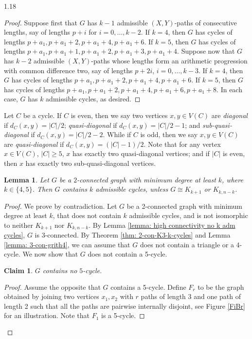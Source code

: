 \documentclass[10pt]{article}
\newtheorem{lemma}[theorem]{Lemma}
\newtheorem{claim}{Claim}
\begin{document}
\begin{spacing}{1.18}
\begin{proof}
    Suppose first that $G$ has $k-1$ admissible $(X,Y)$-paths of consecutive lengths, say of lengths $p+i$ for $i=0,\ldots,k-2$. If $k=4$, then $G$ has cycles of lengths $p+a_1, p+a_1+2, p+a_1+4, p+a_1+6$. If $k=5$, then $G$ has cycles of lengths $p+a_1, p+a_1+1, p+a_1+2, p+a_1+3, p+a_1+4$. Suppose now that $G$ has $k-2$ admissible $(X,Y)$-paths whose lengths form an arithmetic progression with common difference two, say of lengths $p+2i$, $i=0,\ldots,k-3$. If $k=4$, then $G$ has cycles of lengths $p+a_1, p+a_1+2, p+a_1+4, p+a_1+6$. If $k=5$, then $G$ has cycles of lengths $p+a_1, p+a_1+2, p+a_1+4, p+a_1+6, p+a_1+8$. In each case, $G$ has $k$ admissible cycles, as desired.       
\end{proof}

Let $C$ be a cycle. If $C$ is even, then we say two vertices $x,y \in V(C)$ are {\em diagonal} if $d_C(x,y)=|C|/2$; {\em quasi-diagonal} if $d_C(x,y)=|C|/2-1$; and {\em sub-quasi-diagonal} if $d_C(x,y)=|C|/2-2$. While if $C$ is odd, then we say $x,y\in V(C)$ are {\em quasi-diagonal} if $d_C(x,y)=(|C|-1)/2$. Note that for any vertex $x\in V(C)$, $|C|\geqslant 5$, $x$ has exactly two quasi-diagonal vertices; and if $|C|$ is even, then $x$ has exactly two sub-quasi-diagonal vertices. 

\begin{lemma}\label{lemma: k adm cycles for k=4,5}
    Let $G$ be a $2$-connected graph with minimum degree at least $k$, where $k\in \{4,5\}$. Then $G$ contains $k$ admissible cycles, unless $G\cong K_{k+1}$ or $K_{k,n-k}$.
\end{lemma}

\begin{proof}
   We prove by contradiction. Let $G$ be a 2-connected graph with minimum degree at least $k$, that does not contain $k$ admissible cycles, and is not isomorphic to neither $K_{k+1}$ nor $K_{k,n-k}$. 
   By Lemma \ref{lemma: high connectivity no k adm cycles}, $G$ is $3$-connected.
   By Theorem \ref{thm: 2-con-K3-k-cycles} and Lemma \ref{lemma: 3-con-grith4}, we can assume that $G$ does not contain a triangle or a 4-cycle. We now show that $G$ does not contain a 5-cycle.

\setcounter{claim}{0}
\begin{claim}\label{ClNoC5}
    $G$ contains no $5$-cycle.
\end{claim}

\begin{proof}   
    Assume the opposite that $G$ contains a 5-cycle. Define $F_r$ to be the graph obtained by joining two vertices $x_1,x_2$ with $r$ paths of length 3 and one path of length 2 such that all the paths are pairwise internally disjoint, see Figure \ref{FiBr} for an illustration. Note that $F_1$ is a 5-cycle.
    

\end{proof}
\end{proof}
\end{spacing}
\end{document}

